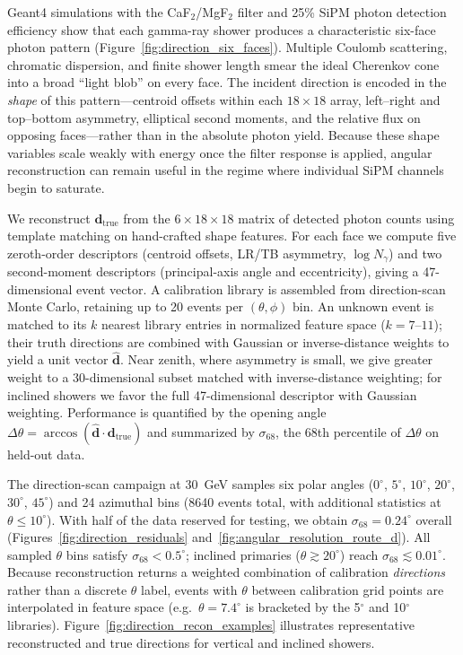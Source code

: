 \documentclass{aastex701}
\begin{document}
Geant4 simulations with the CaF$_2$/MgF$_2$ filter and 25\% SiPM photon detection efficiency show that each gamma-ray shower produces a characteristic six-face photon pattern (Figure~\ref{fig:direction_six_faces}). Multiple Coulomb scattering, chromatic dispersion, and finite shower length smear the ideal Cherenkov cone into a broad ``light blob'' on every face. The incident direction is encoded in the \emph{shape} of this pattern---centroid offsets within each $18\times18$ array, left--right and top--bottom asymmetry, elliptical second moments, and the relative flux on opposing faces---rather than in the absolute photon yield. Because these shape variables scale weakly with energy once the filter response is applied, angular reconstruction can remain useful in the regime where individual SiPM channels begin to saturate.

We reconstruct $\mathbf{d}_\mathrm{true}$ from the $6\times18\times18$ matrix of detected photon counts using template matching on hand-crafted shape features. For each face we compute five zeroth-order descriptors (centroid offsets, LR/TB asymmetry, $\log N_\gamma$) and two second-moment descriptors (principal-axis angle and eccentricity), giving a 47-dimensional event vector. A calibration library is assembled from direction-scan Monte Carlo, retaining up to 20 events per $(\theta,\phi)$ bin. An unknown event is matched to its $k$ nearest library entries in normalized feature space ($k=7$--$11$); their truth directions are combined with Gaussian or inverse-distance weights to yield a unit vector $\hat{\mathbf{d}}$. Near zenith, where asymmetry is small, we give greater weight to a 30-dimensional subset matched with inverse-distance weighting; for inclined showers we favor the full 47-dimensional descriptor with Gaussian weighting. Performance is quantified by the opening angle $\Delta\theta=\arccos(\hat{\mathbf{d}}\cdot\mathbf{d}_\mathrm{true})$ and summarized by $\sigma_{68}$, the 68th percentile of $\Delta\theta$ on held-out data.

The direction-scan campaign at 30~GeV samples six polar angles ($0^\circ$, $5^\circ$, $10^\circ$, $20^\circ$, $30^\circ$, $45^\circ$) and 24 azimuthal bins (8640 events total, with additional statistics at $\theta\le 10^\circ$). With half of the data reserved for testing, we obtain $\sigma_{68}=0.24^\circ$ overall (Figures~\ref{fig:direction_residuals} and~\ref{fig:angular_resolution_route_d}). All sampled $\theta$ bins satisfy $\sigma_{68}<0.5^\circ$; inclined primaries ($\theta\gtrsim 20^\circ$) reach $\sigma_{68}\lesssim 0.01^\circ$. Because reconstruction returns a weighted combination of calibration \emph{directions} rather than a discrete $\theta$ label, events with $\theta$ between calibration grid points are interpolated in feature space (e.g.\ $\theta=7.4^\circ$ is bracketed by the 5$^\circ$ and 10$^\circ$ libraries). Figure~\ref{fig:direction_recon_examples} illustrates representative reconstructed and true directions for vertical and inclined showers.
\end{document}

